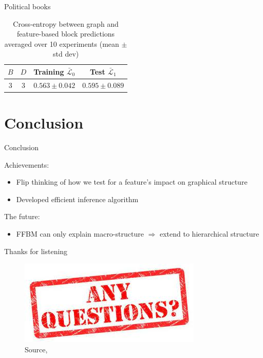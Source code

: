 \documentclass{beamer}
\newcommand{\Lcal}{\mathcal{L}}
\begin{document}
\begin{frame}{Political books \cite{polbooks}}
\begin{figure}[!h]
\begin{subfigure}[t]{0.452\linewidth}
			\end{subfigure}
		\end{figure}
		\begin{table}
			\centering
			\caption{\tiny Cross-entropy between graph and feature-based block predictions averaged over 10 experiments (mean $\pm$ std dev)}
			\begin{tabular}{cc|cc}
				$B$ & $D$ & Training $\bar{\Lcal}_0$ & Test $\bar{\Lcal}_1$ \\ \hline
				3 & 3 & $0.563 \pm 0.042$ & $0.595 \pm 0.089$
			\end{tabular}
		\end{table}
	\end{frame}

\section{Conclusion}

	\begin{frame}{Conclusion}
		\begin{block}{Achievements:}
			\begin{itemize}
				\item Flip thinking of how we test for a feature's impact on graphical structure
				\item Developed efficient inference algorithm
			\end{itemize}
		\end{block}
		
		\begin{alertblock}{The future:}
			\begin{itemize}
				\item FFBM can only explain macro-structure $\Rightarrow$ extend to hierarchical structure
			\end{itemize}
		\end{alertblock}		
	\end{frame}

	
	\begin{frame}{Thanks for listening}
		\begin{figure}
			\includegraphics[width=0.6\linewidth]{any-questions.jpg}
			\caption{Source, \citet{any-Qs}}
		\end{figure}

	\end{frame}
\end{document}

